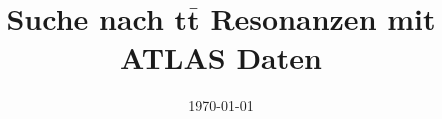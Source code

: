 


\title{Suche nach \texorpdfstring{$\symbf{t\bar{t}}$}{tt} Resonanzen mit ATLAS Daten}
\date{%
   \today %
}



\maketitle
\thispagestyle{empty}
\tableofcontents
\newpage





\printbibliography{}


